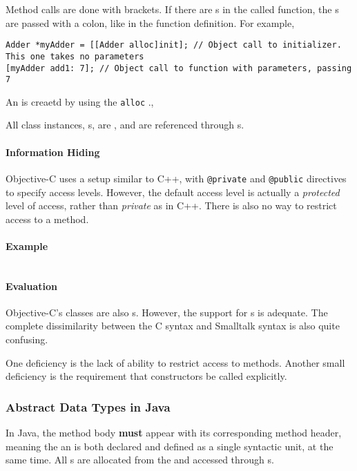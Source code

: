 Method calls are done with brackets.
If there are s in the called function, the s are passed with a colon, like in the function definition.
For example,
\begin{verbatim}
Adder *myAdder = [[Adder alloc]init]; // Object call to initializer. This one takes no parameters
[myAdder add1: 7]; // Object call to function with parameters, passing 7
\end{verbatim}

An  is creaetd by using the \texttt{alloc} .,

All class instances, s, are , and are referenced through s.

\paragraph{Information Hiding}\label{par:Objective_C_Info_Hiding}
Objective-C uses a setup similar to C++, with \texttt{@private} and \texttt{@public} directives to specify access levels.
However, the default access level is actually a \textit{protected} level of access, rather than \textit{private} as in C++.
There is also no way to restrict access to a method.

\paragraph{Example}\label{par:Objective_C_Abstract_Data_Type_Example}
\inputminted[frame=lines,linenos]{objective-c}{./EDAP05-Concepts_Programming_Languages-Sections/Abstract_Data_Types/Code/Class_Example-Stack-Objective_C.m}

\paragraph{Evaluation}\label{par:Objective_C_Abstract_Data_Type_Evaluation}
Objective-C's classes are also s.
However, the support for s is adequate.
The complete dissimilarity between the C syntax and Smalltalk syntax is also quite confusing.

One deficiency is the lack of ability to restrict access to methods.
Another small deficiency is the requirement that constructors be called explicitly.

\subsubsection{Abstract Data Types in Java}\label{subsubsec:Abstract_Data_Types_Java}
In Java, the method body \textbf{must} appear with its corresponding method header, meaning the an  is both declared and defined as a single syntactic unit, at the same time.
All s are allocated from the  and accessed through s.


